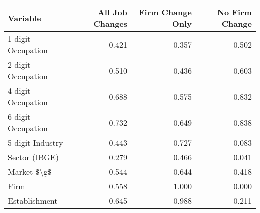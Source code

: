 \begin{tabular}{lrrr}
\toprule
           Variable &  All Job Changes &  Firm Change Only &  No Firm Change \\
\midrule
 1-digit Occupation &            0.421 &             0.357 &           0.502 \\
 2-digit Occupation &            0.510 &             0.436 &           0.603 \\
 4-digit Occupation &            0.688 &             0.575 &           0.832 \\
 6-digit Occupation &            0.732 &             0.649 &           0.838 \\
   5-digit Industry &            0.443 &             0.727 &           0.083 \\
      Sector (IBGE) &            0.279 &             0.466 &           0.041 \\
        Market \$\textbackslash g\$ &            0.544 &             0.644 &           0.418 \\
               Firm &            0.558 &             1.000 &           0.000 \\
      Establishment &            0.645 &             0.988 &           0.211 \\
\bottomrule
\end{tabular}
